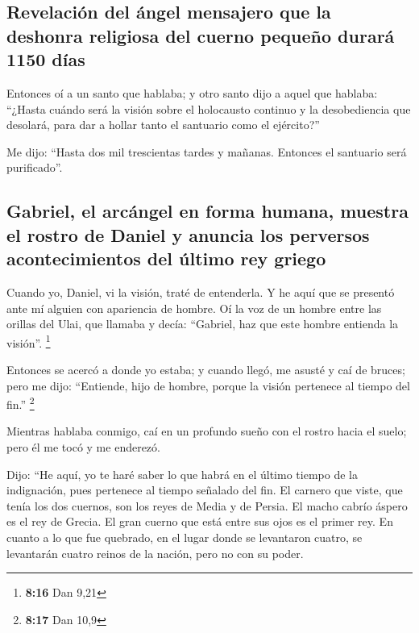 \hypertarget{revelaciuxf3n-del-uxe1ngel-mensajero-que-la-deshonra-religiosa-del-cuerno-pequeuxf1o-duraruxe1-1150-duxedas}{%
\subsection{Revelación del ángel mensajero que la deshonra religiosa del
cuerno pequeño durará 1150
días}\label{revelaciuxf3n-del-uxe1ngel-mensajero-que-la-deshonra-religiosa-del-cuerno-pequeuxf1o-duraruxe1-1150-duxedas}}

 Entonces oí a un santo que hablaba; y otro santo dijo a
aquel que hablaba: ``¿Hasta cuándo será la visión sobre el holocausto
continuo y la desobediencia que desolará, para dar a hollar tanto el
santuario como el ejército?''

 Me dijo: ``Hasta dos mil trescientas tardes y mañanas.
Entonces el santuario será purificado''.

\hypertarget{gabriel-el-arcuxe1ngel-en-forma-humana-muestra-el-rostro-de-daniel-y-anuncia-los-perversos-acontecimientos-del-uxfaltimo-rey-griego}{%
\subsection{Gabriel, el arcángel en forma humana, muestra el rostro de
Daniel y anuncia los perversos acontecimientos del último rey
griego}\label{gabriel-el-arcuxe1ngel-en-forma-humana-muestra-el-rostro-de-daniel-y-anuncia-los-perversos-acontecimientos-del-uxfaltimo-rey-griego}}

 Cuando yo, Daniel, vi la visión, traté de entenderla. Y
he aquí que se presentó ante mí alguien con apariencia de hombre.
 Oí la voz de un hombre entre las orillas del Ulai, que
llamaba y decía: ``Gabriel, haz que este hombre entienda la visión''.
\footnote{\textbf{8:16} Dan 9,21}

 Entonces se acercó a donde yo estaba; y cuando llegó, me
asusté y caí de bruces; pero me dijo: ``Entiende, hijo de hombre, porque
la visión pertenece al tiempo del fin.'' \footnote{\textbf{8:17} Dan
  10,9}

 Mientras hablaba conmigo, caí en un profundo sueño con
el rostro hacia el suelo; pero él me tocó y me enderezó.

 Dijo: ``He aquí, yo te haré saber lo que habrá en el
último tiempo de la indignación, pues pertenece al tiempo señalado del
fin.  El carnero que viste, que tenía los dos cuernos,
son los reyes de Media y de Persia.  El macho cabrío
áspero es el rey de Grecia. El gran cuerno que está entre sus ojos es el
primer rey.  En cuanto a lo que fue quebrado, en el lugar
donde se levantaron cuatro, se levantarán cuatro reinos de la nación,
pero no con su poder.

